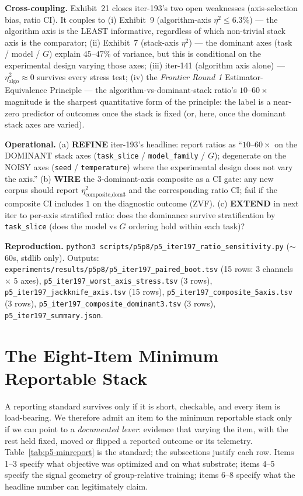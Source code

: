 \documentclass{article}  \usepackage[preprint,nonatbib]{neurips_2026} \usepackage[numbers]{natbib}
\providecommand{\tableref}[1]{Table~\ref{#1}}
\begin{document}
\textbf{Cross-coupling.}
Exhibit~21 closes iter-193's two open weaknesses (axis-selection bias,
ratio CI). It couples to (i) Exhibit~9 (algorithm-axis $\eta^2 \le 6.3\%$)
--- the algorithm axis is the LEAST informative, regardless of which
non-trivial stack axis is the comparator; (ii) Exhibit~7 (stack-axis
$\eta^2$) --- the dominant axes (task / model / $G$) explain $45$--$47\%$
of variance, but this is conditional on the experimental design varying
those axes; (iii) iter-141 (algorithm axis alone) --- $\eta^2_\text{algo} \approx 0$ survives every stress test; (iv) the \emph{Frontier
Round 1} Estimator-Equivalence Principle --- the algorithm-vs-dominant-stack
ratio's $10$--$60\times$ magnitude is the sharpest quantitative form of
the principle: the label is a near-zero predictor of outcomes once the
stack is fixed (or, here, once the dominant stack axes are varied).

\textbf{Operational.} (a) \textbf{REFINE} iter-193's headline: report
ratios as ``$10$--$60\times$ on the DOMINANT stack axes
(\texttt{task\_slice} / \texttt{model\_family} / $G$); degenerate on
the NOISY axes (\texttt{seed} / \texttt{temperature}) where the
experimental design does not vary the axis.'' (b) \textbf{WIRE} the
3-dominant-axis composite as a CI gate: any new corpus should report
$\eta^2_{\text{composite},\text{dom3}}$ and the corresponding ratio CI;
fail if the composite CI includes $1$ on the diagnostic outcome
(\textsc{ZVF}). (c) \textbf{EXTEND} in next iter to per-axis stratified
ratio: does the dominance survive stratification by \texttt{task\_slice}
(does the model vs $G$ ordering hold within each task)?

\textbf{Reproduction.}
\texttt{python3 scripts/p5p8/p5\_iter197\_ratio\_sensitivity.py}
($\sim$60s, stdlib only). Outputs:
\texttt{experiments/results/p5p8/p5\_iter197\_paired\_boot.tsv}
(15 rows: 3 channels $\times$ 5 axes),
\texttt{p5\_iter197\_worst\_axis\_stress.tsv} (3 rows),
\texttt{p5\_iter197\_jackknife\_axis.tsv} (15 rows),
\texttt{p5\_iter197\_composite\_5axis.tsv} (3 rows),
\texttt{p5\_iter197\_composite\_dominant3.tsv} (3 rows),
\texttt{p5\_iter197\_summary.json}.
 \section{The Eight-Item Minimum Reportable Stack}
\label{sec:p5-stack}
A reporting standard survives only if it is short, checkable, and every item is
load-bearing. We therefore admit an item to the minimum reportable stack only
if we can point to a \emph{documented lever}: evidence that varying the item,
with the rest held fixed, moved or flipped a reported outcome or its
telemetry. \tableref{tab:p5-minreport} is the standard; the subsections justify
each row. Items 1--3 specify what objective was optimized and on what
substrate; items 4--5 specify the signal geometry of group-relative training;
items 6--8 specify what the headline number can legitimately claim.
\end{document}
